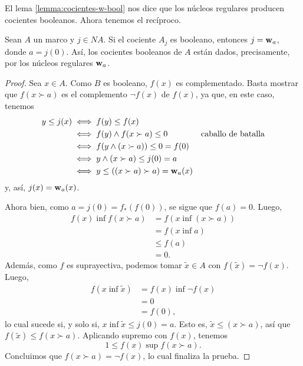 El lema \ref{lemma:cocientes-w-bool} nos dice que los núcleos
regulares producen cocientes booleanos.
Ahora tenemos el recíproco.
\begin{thm}
  Sean $A$ un marco y $j\in NA$.
  Si el cociente $A_j$ es booleano, entonces
  $j=\mathbf w_{a}$, donde $a=j(0)$.
  Así, los cocientes booleanos de $A$ están dados, precisamente,
  por los núcleos regulares $\mathbf w_{a}$.
\end{thm}
\begin{proof}
    Sea $x\in A$. Como $B$ es booleano, $f(x)$ es complementado.
    Basta mostrar que $f(x\succ a)$ es el complemento $\neg f(x)$
    de $f(x)$, ya que, en este caso, tenemos
    \begin{align*}
        y\leq j(x)
        &\iff f(y) \leq f(x) \\
        &\iff f(y) \wedge f(x\succ a) \leq 0
            & \text{caballo de batalla} \\
        &\iff f(y\wedge(x\succ a)) \leq 0 = f(0) \\
        &\iff y\wedge(x\succ a) \leq j(0) = a \\
        &\iff y\leq ((x\succ a)\succ a) = \mathbf w_{a}(x)
    \end{align*}
    y, así, $j(x)=\mathbf w_{a}(x)$.
    
    Ahora bien, como $a=j(0)=f_*(f(0))$, se sigue que $f(a)=0$.
    Luego,
    \begin{align*}
        f(x)\inf f(x\succ a)
        &= f(x\inf(x\succ a)) \\
        &= f(x\inf a) \\
        &\leq f(a) \\
        &= 0.
    \end{align*}
    Además, como $f$ es suprayectiva, podemos tomar
    $\tilde x\in A$ con $f(\tilde x)=\neg f(x)$.
    Luego,
    \begin{align*}
        f(x\inf \tilde x)
        &= f(x)\inf\neg f(x) \\
        &= 0 \\
        &= f(0),
    \end{align*}
    lo cual sucede si, y solo si, $x\inf \tilde x\leq j(0)=a$.
    Esto es, $\tilde x\leq(x\succ a)$, así que
    $f(\tilde x)\leq f(x\succ a)$.
    Aplicando supremo con $f(x)$, tenemos
    \[
        1\leq f(x)\sup f(x\succ a)
    .\]
    Concluimos que $f(x\succ a)=\neg f(x)$, lo cual finaliza la prueba.
\end{proof}

